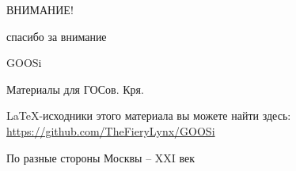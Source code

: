 \begingroup
    \centerline{ВНИМАНИЕ!}
    \centerline{спасибо за внимание}
    \centerline{\hfill\hrulefill\hrulefill\hfill}
    \vskip1.5cm
    \centerline{GOOSi}
    \centerline{Материалы для ГОСов. Кря.}
    \vskip1.5cm
    
    LaTeX-исходники этого материала вы можете найти здесь: \url{https://github.com/TheFieryLynx/GOOSi}

    \bigbreak
    \bigbreak
    \bigbreak
    \bigbreak
    \bigbreak

    \vfill
    \centerline{По разные стороны Москвы -- XXI век}
\endgroup
